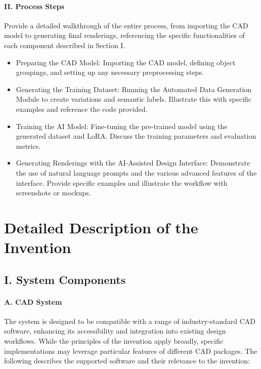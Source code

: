 \documentclass{article}
\begin{document}
\paragraph{II. Process Steps}    

Provide a detailed walkthrough of the entire process, from importing the CAD model to generating final renderings, referencing the specific functionalities of each component described in Section I.

\begin{itemize}
   \item Preparing the CAD Model: Importing the CAD model, defining object groupings, and setting up any necessary preprocessing steps.
   \item Generating the Training Dataset: Running the Automated Data Generation Module to create variations and semantic labels.  Illustrate this with specific examples and reference the code provided.
   \item Training the AI Model:  Fine-tuning the pre-trained model using the generated dataset and LoRA.  Discuss the training parameters and evaluation metrics.
   \item Generating Renderings with the AI-Assisted Design Interface:  Demonstrate the use of natural language prompts and the various advanced features of the interface.  Provide specific examples and illustrate the workflow with screenshots or mockups.
\end{itemize}



\section{Detailed Description of the Invention}

\subsection{I. System Components}

\paragraph{A. CAD System}

The system is designed to be compatible with a range of industry-standard CAD software, enhancing its accessibility and integration into existing design workflows. While the principles of the invention apply broadly, specific implementations may leverage particular features of different CAD packages. The following describes the supported software and their relevance to the invention:
\end{document}
